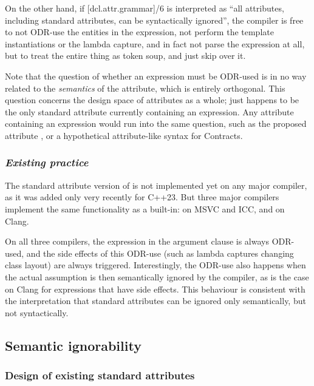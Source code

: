 On the other hand, if [dcl.attr.grammar]/6 is interpreted as ``all attributes, including standard attributes, can be syntactically ignored'', the compiler is free to not ODR-use the entities in the expression, not perform the template instantiations or the lambda capture, and in fact not parse the expression at all, but to treat the entire thing as token soup, and just skip over it.

Note that the question of whether an expression must be ODR-used is in no way related to the \emph{semantics} of the  attribute, which is entirely orthogonal. This question concerns the design space of attributes as a whole;  just happens to be the only standard attribute currently containing an expression. Any attribute containing an expression would run into the same question, such as the proposed  attribute \cite{P1144R5}, or a hypothetical attribute-like syntax for Contracts.

\subsubsection*{\emph{Existing practice}}

The standard attribute version of  is not implemented yet on any major compiler, as it was added only very recently for C++23. But three major compilers implement the same functionality as a built-in:  on MSVC and ICC, and \mbox{} on Clang.

On all three compilers, the expression in the argument clause is always ODR-used, and the side effects of this ODR-use (such as lambda captures changing class layout) are always triggered. Interestingly, the ODR-use also happens when the actual assumption is then semantically ignored by the compiler, as is the case on Clang for expressions that have side effects. This behaviour is consistent with the interpretation that standard attributes can be ignored only semantically, but not syntactically.

\subsection{Semantic ignorability}
\label{subsec:semantic}

\subsubsection{Design of existing standard attributes}

